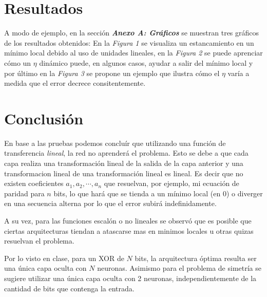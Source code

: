 \documentclass[%
    final,
    reprint,
    notitlepage,
    narroweqnarray,
    inline,
    twoside,
    invited
    ]{ieee}
\begin{document}
\section{Resultados}

\par A modo de ejemplo, en la sección \textit{\textbf{Anexo A: Gráficos}} se muestran tres gráficos de los resultados obtenidos: En la \textit{Figura 1} se visualiza un estancamiento en un mínimo local debido al uso de unidades lineales, en la \textit{Figura 2} se puede aprenciar cómo un $\eta$ dinámico puede, en algunos casos, ayudar a salir del mínimo local y por último en la \textit{Figura 3} se propone un ejemplo que ilustra cómo el $\eta$ varía a medida que el error decrece consitentemente.


\section{Conclusión}

\par En base a las pruebas podemos concluír que utilizando una función de transferencia \textit{lineal}, la red no aprenderá el problema. Esto se debe a que cada capa realiza una transformación lineal de la salida de la capa anterior y una transformacion lineal de una transformación lineal es lineal. Es decir que no existen coeficientes $a_1, a_2, \cdots, a_n$ que resuelvan, por ejemplo, mi ecuación de paridad para $n$ bits, lo que hará que se tienda a un mínimo local (en 0) o diverger en una secuencia alterna por lo que el error subirá indefinidamente.

\par A su vez, para las funciones escalón o no lineales se observó que es posible que ciertas arquitecturas tiendan a atascarse mas en minimos locales u otras quizas resuelvan el problema.
\par Por lo visto en clase, para un XOR de $N$ bits, la arquitectura óptima resulta ser una única capa oculta con $N$ neuronas. Asimismo para el problema de simetría se sugiere utilizar una única capa oculta con 2 neuronas, independientemente de la cantidad de bits que contenga la entrada.




\end{document}
